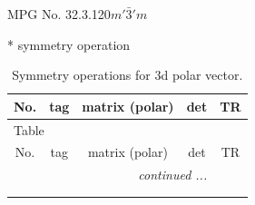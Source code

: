\documentclass[fleqn,8pt]{jsarticle}
\begin{document}
\setcounter{MaxMatrixCols}{32}

\renewcommand{\tablename}{Table~}
\renewcommand{\figurename}{Figure~}
\begin{center}
\LARGE
MPG No. 32.3.120\quad$m'\bar{3}'m$
\end{center}
* symmetry operation
\renewcommand{\arraystretch}{1.3}
\begin{longtable}{ccccc}
\caption{Symmetry operations for 3d polar vector.}
 \\
 \hline \hline
No. & tag & matrix (polar) & det & TR \\ \hline \endfirsthead

\multicolumn{4}{l}{\tablename\ \thetable{}} \\
 \hline \hline
No. & tag & matrix (polar) & det & TR \\ \hline \endhead

 \hline \hline
\multicolumn{4}{r}{\footnotesize\it continued ...} \\ \endfoot

 \hline \hline
\multicolumn{4}{r}{} \\ \endlastfoot


\end{longtable}
\end{document}
